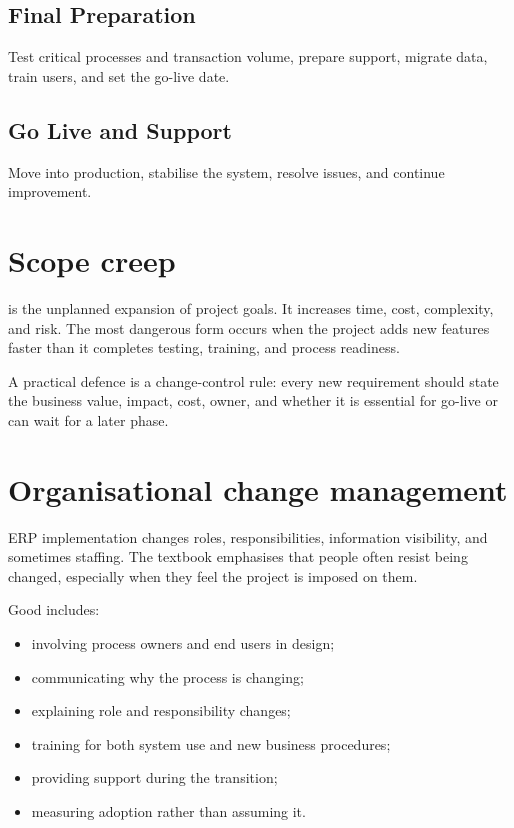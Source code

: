 \subsection{Final Preparation}
Test critical processes and transaction volume, prepare support, migrate data, train users, and set the go-live date.

\subsection{Go Live and Support}
Move into production, stabilise the system, resolve issues, and continue improvement.

\section{Scope creep}

 is the unplanned expansion of project goals. It increases time, cost, complexity, and risk. The most dangerous form occurs when the project adds new features faster than it completes testing, training, and process readiness.

A practical defence is a change-control rule: every new requirement should state the business value, impact, cost, owner, and whether it is essential for go-live or can wait for a later phase.

\section{Organisational change management}

ERP implementation changes roles, responsibilities, information visibility, and sometimes staffing. The textbook emphasises that people often resist being changed, especially when they feel the project is imposed on them.

Good  includes:

\begin{itemize}
  \item involving process owners and end users in design;
  \item communicating why the process is changing;
  \item explaining role and responsibility changes;
  \item training for both system use and new business procedures;
  \item providing support during the transition;
  \item measuring adoption rather than assuming it.
\end{itemize}

